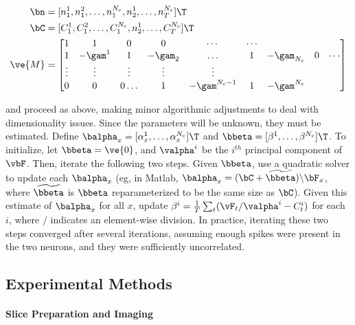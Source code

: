 \begin{align} \label{eq:M2}
\bn &=  [n^1_1, n^2_1, \ldots, n^{N_c}_1, n^1_2, \ldots, n^{N_c}_T]\T \\
\bC &=  [C^1_1, C^2_1, \ldots, C^{N_c}_1, n^1_2, \ldots, C^{N_c}_T]\T \\
\ve{M} &= %
\begin{bmatrix}
1 & 1 & 0 & 0 & \cdots & \cdots \\
1 & -\gam^1 & 1 & -\gam_2 & \ldots & 1 & -\gam_{N_c}  & 0 & \cdots \\
\vdots & \vdots & \vdots & \vdots & \vdots  \\
0 & 0 & 0 \ldots & 1 & -\gam^{N_c-1} & 1 & -\gam^{N_c}
\end{bmatrix}
\end{align} 

\noindent and proceed as above, making minor algorithmic adjustments to deal with dimensionality issues.  Since the parameters will be unknown, they must be estimated. Define $\balpha_x=[\alpha_x^1, \ldots, \alpha_x^{N_c}]\T$ and $\bbeta=[\beta^1, \ldots, \beta^{N_c}]\T$.  To initialize, let $\bbeta=\ve{0}$, and $\valpha^i$ be the $i^{th}$ principal component of $\vbF$.  Then, iterate the following two steps.  Given $\bbeta$, use a quadratic solver to update each $\balpha_x$ (eg, in Matlab, $\balpha_x = (\bC + \widetilde{\bbeta})\backslash \bF_x$, where $\widetilde{\bbeta}$ is $\bbeta$ reparameterized to be the same size as $\bC$).  Given this estimate of $\balpha_x$ for all $x$, update $\beta^i= \frac{1}{T}\sum_t (\vF_t / \valpha^i - C_t^i)$ for each $i$, where $/$ indicates an element-wise division.  In practice, iterating these two steps converged after several iterations, assuming enough spikes were present in the two neurons, and they were sufficiently uncorrelated.








\subsection{Experimental Methods} \label{sec:exp}

\paragraph{Slice Preparation and Imaging}

